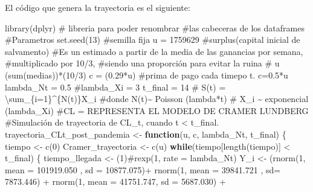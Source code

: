 \documentclass[
  us-letterpaper,
]{scrreprt}
\newenvironment{Shaded}{\begin{snugshade}}{\end{snugshade}}
\newcommand{\AttributeTok}[1]{\textcolor[rgb]{0.40,0.45,0.13}{#1}}
\newcommand{\CommentTok}[1]{\textcolor[rgb]{0.37,0.37,0.37}{#1}}
\newcommand{\ControlFlowTok}[1]{\textcolor[rgb]{0.00,0.23,0.31}{\textbf{#1}}}
\newcommand{\DecValTok}[1]{\textcolor[rgb]{0.68,0.00,0.00}{#1}}
\newcommand{\FloatTok}[1]{\textcolor[rgb]{0.68,0.00,0.00}{#1}}
\newcommand{\FunctionTok}[1]{\textcolor[rgb]{0.28,0.35,0.67}{#1}}
\newcommand{\NormalTok}[1]{\textcolor[rgb]{0.00,0.23,0.31}{#1}}
\newcommand{\OtherTok}[1]{\textcolor[rgb]{0.00,0.23,0.31}{#1}}
\newcommand{\SpecialCharTok}[1]{\textcolor[rgb]{0.37,0.37,0.37}{#1}}
\theoremstyle{plain}
\theoremstyle{plain}
\theoremstyle{definition}
\theoremstyle{remark}
\begin{document}
El código que genera la trayectoria es el siguiente:

\begin{Shaded}
\begin{Highlighting}[]
\FunctionTok{library}\NormalTok{(dplyr) }\CommentTok{\# libreria para poder renombrar }
\CommentTok{\#las cabeceras de los dataframes}
\CommentTok{\#Parametros}
\FunctionTok{set.seed}\NormalTok{(}\DecValTok{13}\NormalTok{) }\CommentTok{\#semilla fija}
\NormalTok{u }\OtherTok{=} \DecValTok{1759629} \CommentTok{\#surplus(capital inicial de salvamento)}
\CommentTok{\#Es un estimado a partir de la media de las ganancias por semana, }
\CommentTok{\#multiplicado por 10/3, }
\CommentTok{\#siendo una proporción para evitar la ruina}
\CommentTok{\# u (sum(medias))*(10/3)}
\NormalTok{c }\OtherTok{=}\NormalTok{ (}\FloatTok{0.29}\SpecialCharTok{*}\NormalTok{u) }\CommentTok{\#prima de pago cada timepo t. c=0.5*u}
\NormalTok{lambda\_Nt }\OtherTok{=} \FloatTok{0.5}
\CommentTok{\#lambda\_Xi = 3}
\NormalTok{t\_final }\OtherTok{=} \DecValTok{14}
\CommentTok{\# S(t) = \textbackslash{}sum\_\{i=1\}\^{}\{N(t)\}X\_i}
\CommentTok{\#donde N(t)\textasciitilde{} Poisson (lambda*t)}
\CommentTok{\# X\_i \textasciitilde{} exponencial (lambda\_Xi)}
\CommentTok{\#CL = REPRESENTA EL MODELO DE CRAMER LUNDBERG}
\CommentTok{\#Simulación de trayectoria de CL\_t, cuando t \textless{} t\_final.}
\NormalTok{trayectoria\_CLt\_post\_pandemia }\OtherTok{\textless{}{-}} \ControlFlowTok{function}\NormalTok{(u, c, lambda\_Nt, t\_final)}
\NormalTok{\{}
\NormalTok{  tiempo }\OtherTok{\textless{}{-}} \FunctionTok{c}\NormalTok{(}\DecValTok{0}\NormalTok{)}
\NormalTok{  Cramer\_trayectoria }\OtherTok{\textless{}{-}} \FunctionTok{c}\NormalTok{(u)}
  \ControlFlowTok{while}\NormalTok{(tiempo[}\FunctionTok{length}\NormalTok{(tiempo)] }\SpecialCharTok{\textless{}}\NormalTok{ t\_final)}
\NormalTok{  \{}
\NormalTok{    tiempo\_llegada }\OtherTok{\textless{}{-}}\NormalTok{ (}\DecValTok{1}\NormalTok{)}\CommentTok{\#rexp(1, rate = lambda\_Nt)}
\NormalTok{    Y\_i }\OtherTok{\textless{}{-}}\NormalTok{  (}\FunctionTok{rnorm}\NormalTok{(}\DecValTok{1}\NormalTok{, }\AttributeTok{mean =} \FloatTok{101919.050}\NormalTok{ , }\AttributeTok{sd =} \FloatTok{10877.075}\NormalTok{)}\SpecialCharTok{+}
             \FunctionTok{rnorm}\NormalTok{(}\DecValTok{1}\NormalTok{, }\AttributeTok{mean =}  \FloatTok{39841.721}\NormalTok{ , }\AttributeTok{sd=} \FloatTok{7873.446}\NormalTok{)  }\SpecialCharTok{+} 
             \FunctionTok{rnorm}\NormalTok{(}\DecValTok{1}\NormalTok{, }\AttributeTok{mean =}   \FloatTok{41751.747}\NormalTok{, }\AttributeTok{sd =} \FloatTok{5687.030}\NormalTok{) }\SpecialCharTok{+} 

\end{Highlighting}
\end{Shaded}
\end{document}
